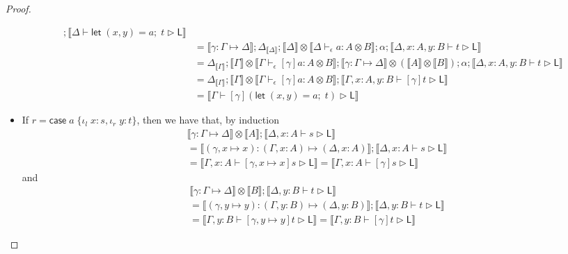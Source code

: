 \documentclass[acmsmall,screen,review]{acmart}
\newcommand{\ms}[1]{\ensuremath{\mathsf{#1}}}
\newcommand{\lto}{:}
\newcommand{\linl}[1]{\iota_l\;{#1}}
\newcommand{\linr}[1]{\iota_r\;{#1}}
\newcommand{\letexpr}[3]{\ensuremath{\ms{let}\;#1 = #2;\;#3}}
\newcommand{\casestmt}[5]{\ms{case}\;#1\;\{\linl{#2} \lto #3, \linr{#4} \lto #5\}}
\newcommand{\bhyp}[2]{#1 : #2}
\newcommand{\hasty}[4]{#1 \vdash_{#2} #3: {#4}}
\newcommand{\haslb}[3]{#1 \vdash #2 \rhd #3}
\newcommand{\issubst}[3]{#1: #2 \mapsto #3}
\newcommand{\dnt}[1]{\llbracket{#1}\rrbracket}
\begin{document}
\begin{proof}
\begin{itemize}[leftmargin=*]
\begin{equation}
\begin{aligned}
        ; \dnt{\haslb{\Delta}{\letexpr{(x, y)}{a}{t}}{\ms{L}}} \\
        &= \dnt{\issubst{\gamma}{\Gamma}{\Delta}}
        ; \Delta_{\dnt{\Delta}} 
        ; \dnt{\Delta} \otimes \dnt{\hasty{\Delta}{\epsilon}{a}{A \otimes B}}
        ; \alpha ; \dnt{\haslb{\Delta, \bhyp{x}{A}, \bhyp{y}{B}}{t}{\ms{L}}} \\
        &= \Delta_{\dnt{\Gamma}} 
        ; \dnt{\Gamma} \otimes \dnt{\hasty{\Gamma}{\epsilon}{[\gamma]a}{A \otimes B}}
        ; \dnt{\issubst{\gamma}{\Gamma}{\Delta}} \otimes (\dnt{A} \otimes \dnt{B}) ; \alpha
        ; \dnt{\haslb{\Delta, \bhyp{x}{A}, \bhyp{y}{B}}{t}{\ms{L}}} \\
        &= \Delta_{\dnt{\Gamma}}
        ; \dnt{\Gamma} \otimes \dnt{\hasty{\Gamma}{\epsilon}{[\gamma]a}{A \otimes B}}
        ; \dnt{\haslb{\Gamma, \bhyp{x}{A}, \bhyp{y}{B}}{[\gamma]t}{\ms{L}}} \\
        &= \dnt{\haslb{\Gamma}{[\gamma](\letexpr{(x, y)}{a}{t})}{\ms{L}}}
      \end{aligned}
    \end{equation}
    \item If $r = \casestmt{a}{x}{s}{y}{t}$, then we have that, by induction
    \begin{equation}
      \begin{aligned}
      & \dnt{\issubst{\gamma}{\Gamma}{\Delta}} \otimes \dnt{A} 
      ; \dnt{\haslb{\Delta, \bhyp{x}{A}}{s}{\ms{L}}}
      \\ &= \dnt{\issubst{(\gamma, x \mapsto x)}{(\Gamma, \bhyp{x}{A})}{(\Delta, \bhyp{x}{A})}}
      ; \dnt{\haslb{\Delta, \bhyp{x}{A}}{s}{\ms{L}}}
      \\ &= \dnt{\haslb{\Gamma, \bhyp{x}{A}}{[\gamma, x \mapsto x]s}{\ms{L}}}
          = \dnt{\haslb{\Gamma, \bhyp{x}{A}}{[\gamma]s}{\ms{L}}}
      \end{aligned}
    \end{equation}
    and
    \begin{equation}
      \begin{aligned}
      & \dnt{\issubst{\gamma}{\Gamma}{\Delta}} \otimes \dnt{B} 
      ; \dnt{\haslb{\Delta, \bhyp{y}{B}}{t}{\ms{L}}}
      \\ &= \dnt{\issubst{(\gamma, y \mapsto y)}{(\Gamma, \bhyp{y}{B})}{(\Delta, \bhyp{y}{B})}}
      ; \dnt{\haslb{\Delta, \bhyp{y}{B}}{t}{\ms{L}}}
      \\ &= \dnt{\haslb{\Gamma, \bhyp{y}{B}}{[\gamma, y \mapsto y]t}{\ms{L}}}
          = \dnt{\haslb{\Gamma, \bhyp{y}{B}}{[\gamma]t}{\ms{L}}}

\end{aligned}
\end{equation}
\end{itemize}
\end{proof}
\end{document}
